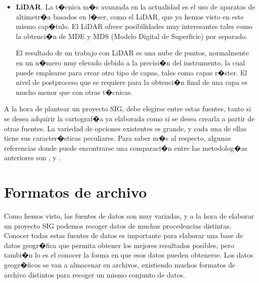 \begin{itemize}
Un uso muy habitual de esta t�cnica es con los denominados \emph{Radares de Apertura Sint�tica}\footnote{Synthetic Aperture Radar (SAR)}, utilizado por ejemplo en el caso de la misi�n SRTM, que rese�amos anteriormente como producto importante. La medici�n desde dos puntos puede hacerse con dos pasadas de sat�lite (caso por ejemplo del ERS) o bien en una sola si la plataforma dispone de dos receptores separados una cierta distancia (caso del SRTM). En \cite{SARInterferometry} puede encontrarse una descripci�n detallada de este tipo de t�cnicas y las etapas que comprenden.
\item \textbf{LiDAR}. La t�cnica m�s avanzada en la actualidad es el uso de aparatos de altimetr�a basados en l�ser, como el LiDAR, que ya hemos visto en este mismo cap�tulo. El LiDAR ofrece posibilidades muy interesantes tales como la obtenci�n de MDE y MDS (Modelo Digital de Superficie) por separado. 

El resultado de un trabajo con LiDAR es una nube de puntos, normalmente en un n�mero muy elevado debido a la precisi�n del instrumento, la cual puede emplearse para crear otro tipo de capas, tales como capas r�ster. El nivel de postproceso que se requiere para la obtenci�n final de una capa es mucho menor que con otras t�cnicas.
\end{itemize}

A la hora de plantear un proyecto SIG, debe elegirse entre estas fuentes, tanto si se desea adquirir la cartograf�a ya elaborada como si se desea crearla a partir de otras fuentes. La variedad de opciones existentes es grande, y cada una de ellas tiene sus caracter�sticas peculiares. Para saber m�s al respecto, algunas referencias donde puede encontrarse una comparaci�n entre las metodolog�as anteriores son \cite{Nikolakopoulos2006IJRS}, \cite{Mercer1999ISPRS} y \cite{Mercer2001PW}.

\section{Formatos de archivo}
\label{Formatos_archivo}

Como hemos visto, las fuentes de datos son muy variadas, y a la hora de elaborar un proyecto SIG podemos recoger datos de muchas procedencias distintas. Conocer todas estas fuentes de datos es importante para elaborar una base de datos geogr�fica que permita obtener los mejores resultados posibles, pero tambi�n lo es el conocer la forma en que esos datos pueden obtenerse. Los datos geogr�ficos se van a almacenar en archivos, existiendo muchos formatos de archivo distintos para recoger un mismo conjunto de datos.

